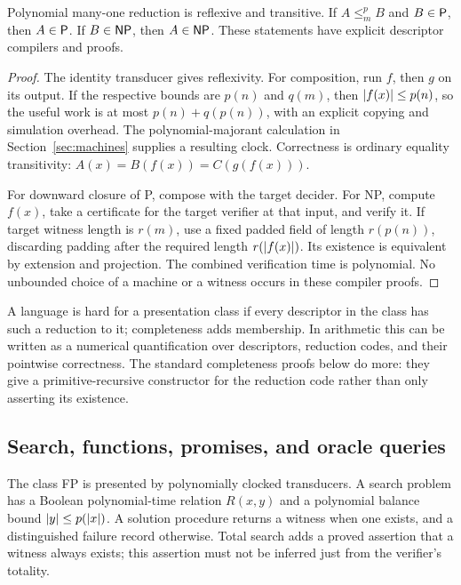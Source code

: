 \begin{theorem}
\label{thm:reduction}
Polynomial many-one reduction is reflexive and transitive. If \(A\le_m^pB\)
and \(B\in\mathsf P\), then \(A\in\mathsf P\). If \(B\in\mathsf{NP}\), then
\(A\in\mathsf{NP}\). These statements have explicit descriptor compilers and
\ipra{} proofs.
\end{theorem}

\begin{proof}
The identity transducer gives reflexivity. For composition, run \(f\), then
\(g\) on its output. If the respective bounds are \(p(n)\) and \(q(m)\),
then \(\lvert f(x)\rvert\le p(n)\), so the useful work is at most
\(p(n)+q(p(n))\), with an explicit copying and simulation overhead.
The polynomial-majorant calculation in Section~\ref{sec:machines} supplies
a resulting clock. Correctness is ordinary equality transitivity:
\(A(x)=B(f(x))=C(g(f(x)))\).

For downward closure of P, compose with the target decider. For NP, compute
\(f(x)\), take a certificate for the target verifier at that input, and
verify it. If target witness length is \(r(m)\), use a fixed padded field
of length \(r(p(n))\), discarding padding after the required length
\(r(\lvert f(x)\rvert)\). Its existence is equivalent by extension and projection.
The combined verification time is polynomial. No unbounded choice of a
machine or a witness occurs in these compiler proofs.
\end{proof}

A language is hard for a presentation class if every descriptor in the class
has such a reduction to it; completeness adds membership. In arithmetic this
can be written as a numerical quantification over descriptors, reduction
codes, and their pointwise correctness. The standard completeness proofs
below do more: they give a primitive-recursive constructor for the reduction
code rather than only asserting its existence.

\subsection{Search, functions, promises, and oracle queries}

The class FP is presented by polynomially clocked transducers. A search
problem has a Boolean polynomial-time relation \(R(x,y)\) and a polynomial
balance bound \(\lvert y\rvert\le p(\lvert x\rvert)\). A solution procedure returns a witness
when one exists, and a distinguished failure record otherwise. Total search
adds a proved assertion that a witness always exists; this assertion must
not be inferred just from the verifier's totality.

